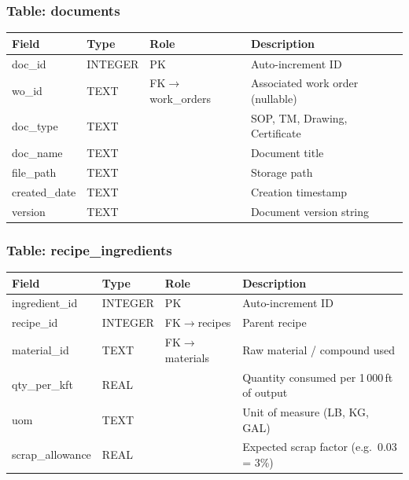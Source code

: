 \documentclass[11pt]{article}
\begin{document}
\subsubsection*{Table: documents}
\begin{table}[H]\centering\small
\begin{tabular}{@{} l l l L{5.5cm} @{}}
\toprule
\textbf{Field} & \textbf{Type} & \textbf{Role} & \textbf{Description} \\
\midrule
doc\_id       & INTEGER & PK  & Auto-increment ID \\
wo\_id        & TEXT    & FK$\to$work\_orders & Associated work order (nullable) \\
doc\_type     & TEXT    &     & SOP, TM, Drawing, Certificate \\
doc\_name     & TEXT    &     & Document title \\
file\_path    & TEXT    &     & Storage path \\
created\_date & TEXT    &     & Creation timestamp \\
version       & TEXT    &     & Document version string \\
\bottomrule
\end{tabular}
\end{table}

\subsubsection*{Table: recipe\_ingredients}
\begin{table}[H]\centering\small
\begin{tabular}{@{} l l l L{5.0cm} @{}}
\toprule
\textbf{Field} & \textbf{Type} & \textbf{Role} & \textbf{Description} \\
\midrule
ingredient\_id & INTEGER & PK  & Auto-increment ID \\
recipe\_id     & INTEGER & FK$\to$recipes & Parent recipe \\
material\_id   & TEXT    & FK$\to$materials & Raw material / compound used \\
qty\_per\_kft   & REAL   &     & Quantity consumed per 1\,000\,ft of output \\
uom           & TEXT    &     & Unit of measure (LB, KG, GAL) \\
scrap\_allowance & REAL  &     & Expected scrap factor (e.g.\ 0.03 = 3\%) \\
\bottomrule
\end{tabular}
\end{table}
\end{document}
